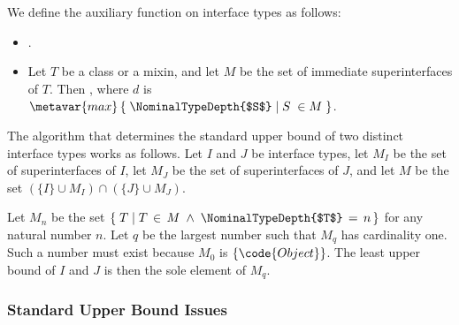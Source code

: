 \documentclass[makeidx]{article}
\begin{document}
{


\LMHash{}%
We define the auxiliary function \NominalTypeDepthName{}
on interface types as follows:

\begin{itemize}
\item
  .
\item
  Let $T$ be a class or a mixin,
  and let $M$ be the set of immediate superinterfaces of $T$.
  Then ,
  where $d$ is
  $\metavar{max}\,\{\;\NominalTypeDepth{$S$}\;|\;S\;\in M\;\}$.
\end{itemize}

\LMHash{}%
%
The algorithm that determines
the standard upper bound of two distinct interface types
works as follows.
Let $I$ and $J$ be interface types,
let $M_I$ be the set of superinterfaces of $I$,
let $M_J$ be the set of superinterfaces of $J$,
and let $M$ be the set $(\{I\} \cup M_I) \cap (\{J\} \cup M_J)$.

\LMHash{}%
Let $M_n$ be the set
$\{\;T\;|\;T\,\in\,M\;\wedge\;\NominalTypeDepth{$T$}\,=\,n\,\}$
for any natural number $n$.
Let $q$ be the largest number such that $M_q$ has cardinality one.
Such a number must exist because $M_0$ is $\{\code{Object}\}$.
The least upper bound of $I$ and $J$ is then the sole element of $M_q$.


\subsubsection{Standard Upper Bound Issues}

}
\end{document}
